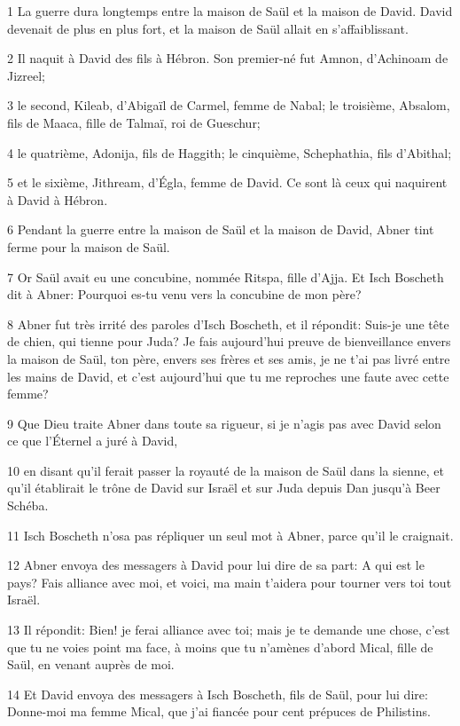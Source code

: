 \par 1 La guerre dura longtemps entre la maison de Saül et la maison de David. David devenait de plus en plus fort, et la maison de Saül allait en s'affaiblissant.
\par 2 Il naquit à David des fils à Hébron. Son premier-né fut Amnon, d'Achinoam de Jizreel;
\par 3 le second, Kileab, d'Abigaïl de Carmel, femme de Nabal; le troisième, Absalom, fils de Maaca, fille de Talmaï, roi de Gueschur;
\par 4 le quatrième, Adonija, fils de Haggith; le cinquième, Schephathia, fils d'Abithal;
\par 5 et le sixième, Jithream, d'Égla, femme de David. Ce sont là ceux qui naquirent à David à Hébron.
\par 6 Pendant la guerre entre la maison de Saül et la maison de David, Abner tint ferme pour la maison de Saül.
\par 7 Or Saül avait eu une concubine, nommée Ritspa, fille d'Ajja. Et Isch Boscheth dit à Abner: Pourquoi es-tu venu vers la concubine de mon père?
\par 8 Abner fut très irrité des paroles d'Isch Boscheth, et il répondit: Suis-je une tête de chien, qui tienne pour Juda? Je fais aujourd'hui preuve de bienveillance envers la maison de Saül, ton père, envers ses frères et ses amis, je ne t'ai pas livré entre les mains de David, et c'est aujourd'hui que tu me reproches une faute avec cette femme?
\par 9 Que Dieu traite Abner dans toute sa rigueur, si je n'agis pas avec David selon ce que l'Éternel a juré à David,
\par 10 en disant qu'il ferait passer la royauté de la maison de Saül dans la sienne, et qu'il établirait le trône de David sur Israël et sur Juda depuis Dan jusqu'à Beer Schéba.
\par 11 Isch Boscheth n'osa pas répliquer un seul mot à Abner, parce qu'il le craignait.
\par 12 Abner envoya des messagers à David pour lui dire de sa part: A qui est le pays? Fais alliance avec moi, et voici, ma main t'aidera pour tourner vers toi tout Israël.
\par 13 Il répondit: Bien! je ferai alliance avec toi; mais je te demande une chose, c'est que tu ne voies point ma face, à moins que tu n'amènes d'abord Mical, fille de Saül, en venant auprès de moi.
\par 14 Et David envoya des messagers à Isch Boscheth, fils de Saül, pour lui dire: Donne-moi ma femme Mical, que j'ai fiancée pour cent prépuces de Philistins.
